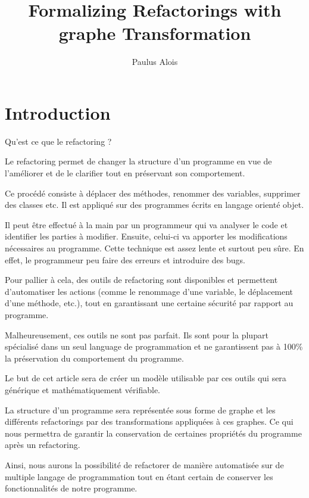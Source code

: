 \documentclass[a4paper, 12pt]{article}
\title{Formalizing Refactorings with graphe Transformation}
\author{Paulus Alois}
\begin{document}
  \maketitle

  \tableofcontents

  \newpage

  \section{Introduction}

  Qu'est ce que le refactoring ?

  Le refactoring permet de changer la structure d'un programme en vue de l'améliorer et de le clarifier tout en préservant son comportement.

  Ce procédé consiste à déplacer des méthodes, renommer des variables, supprimer des classes etc. Il est appliqué sur des programmes écrits en langage orienté objet.

  Il peut être effectué à la main par un programmeur qui va analyser le code et identifier les parties à modifier. Ensuite, celui-ci va apporter les modifications nécessaires au programme.
  Cette technique est assez lente et surtout peu sûre. En effet, le programmeur peu faire des erreurs et introduire des bugs.

  Pour pallier à cela, des outils de refactoring sont disponibles et permettent d'automatiser les actions (comme le renommage d'une variable, le déplacement d'une méthode, etc.),
  tout en garantissant une certaine sécurité par rapport au programme.

  Malheureusement, ces outils ne sont pas parfait. Ils sont pour la plupart spécialisé dans un seul language de programmation et ne garantissent pas à 100\% la préservation du comportement du programme.

  Le but de cet article sera de créer un modèle utilisable par ces outils qui sera générique et mathématiquement vérifiable.

  La structure d'un programme sera représentée sous forme de graphe et les différents refactorings par des transformations appliquées à ces graphes.
  Ce qui nous permettra de garantir la conservation de certaines propriétés du programme après un refactoring.

  Ainsi, nous aurons la possibilité de refactorer de manière automatisée sur de multiple langage de programmation tout en étant certain de conserver les fonctionnalités de notre programme.
\end{document}
